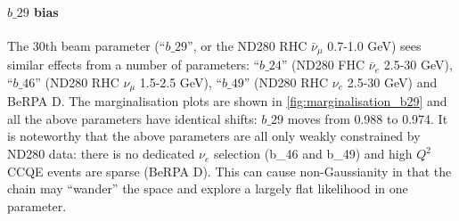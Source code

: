 \paragraph{$b\_29$ bias}
The 30th beam parameter (``$b\_29$'', or the ND280 RHC $\bar{\nu}_\mu$ 0.7-1.0 GeV) sees similar effects from a number of parameters:
``$b\_24$'' (ND280 FHC $\bar{\nu}_e$ 2.5-30 GeV), ``$b\_46$'' (ND280 RHC $\nu_\mu$ 1.5-2.5 GeV), ``$b\_49$'' (ND280 RHC $\nu_e$ 2.5-30 GeV) and BeRPA D. The marginalisation plots are shown in \autoref{fig:marginalisation_b29} and all the above parameters have identical shifts: $b\_29$ moves from 0.988 to 0.974. It is noteworthy that the above parameters are all only weakly constrained by ND280 data: there is no dedicated $\nu_e$ selection (b\_46 and b\_49) and high $Q^2$ CCQE events are sparse (BeRPA D). This can cause non-Gaussianity in that the chain may ``wander'' the space and explore a largely flat likelihood in one parameter.

